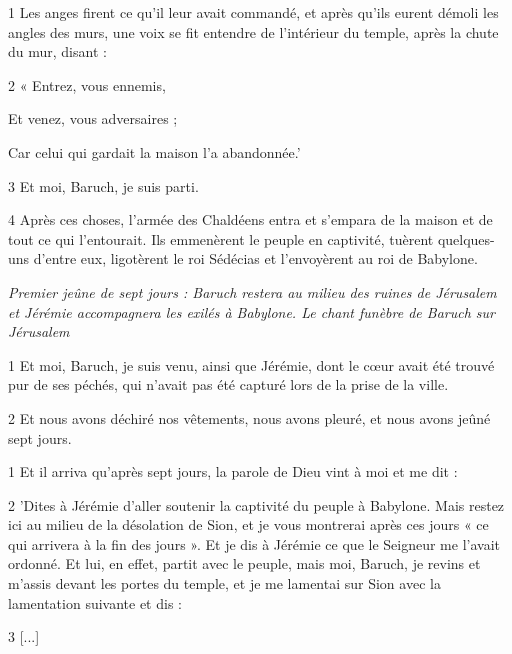 \par 1 Les anges firent ce qu'il leur avait commandé, et après qu'ils eurent démoli les angles des murs, une voix se fit entendre de l'intérieur du temple, après la chute du mur, disant :

\par 2 « Entrez, vous ennemis,

\par Et venez, vous adversaires ;

\par Car celui qui gardait la maison l'a abandonnée.'

\par 3 Et moi, Baruch, je suis parti.

\par 4 Après ces choses, l'armée des Chaldéens entra et s'empara de la maison et de tout ce qui l'entourait. Ils emmenèrent le peuple en captivité, tuèrent quelques-uns d'entre eux, ligotèrent le roi Sédécias et l'envoyèrent au roi de Babylone.


\par \textit{Premier jeûne de sept jours : Baruch restera au milieu des ruines de Jérusalem et Jérémie accompagnera les exilés à Babylone. Le chant funèbre de Baruch sur Jérusalem}

\par 1 Et moi, Baruch, je suis venu, ainsi que Jérémie, dont le cœur avait été trouvé pur de ses péchés, qui n'avait pas été capturé lors de la prise de la ville.

\par 2 Et nous avons déchiré nos vêtements, nous avons pleuré, et nous avons jeûné sept jours.


\par 1 Et il arriva qu'après sept jours, la parole de Dieu vint à moi et me dit :

\par 2 'Dites à Jérémie d'aller soutenir la captivité du peuple à Babylone. Mais restez ici au milieu de la désolation de Sion, et je vous montrerai après ces jours « ce qui arrivera à la fin des jours ». Et je dis à Jérémie ce que le Seigneur me l'avait ordonné. Et lui, en effet, partit avec le peuple, mais moi, Baruch, je revins et m'assis devant les portes du temple, et je me lamentai sur Sion avec la lamentation suivante et dis :

\par 3 [...]

